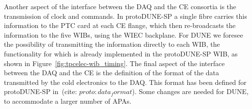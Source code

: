 Another aspect of the interface between the DAQ and the CE consortia is the
transmission of clock and commands. In protoDUNE-SP a single fibre
carries this information to the PTC card at each CE flange, which then re-broadcasts
the information to the five WIBs, using the WIEC backplane. For DUNE we
foresee the possibility of transmitting the information directly to each
WIB, the functionality for which is already implemented in the protoDUNE-SP WIB, as
shown in Figure~\ref{fig:tpcelec-wib_timing}.
The final aspect of the interface between the DAQ and the CE is
the definition of the format of the data transmitted by the cold electronics
to the DAQ. This format has been defined for protoDUNE-SP in~(cite: $proto:data_format$).
Some changes are needed for DUNE, to accommodate a larger number of APAs.

